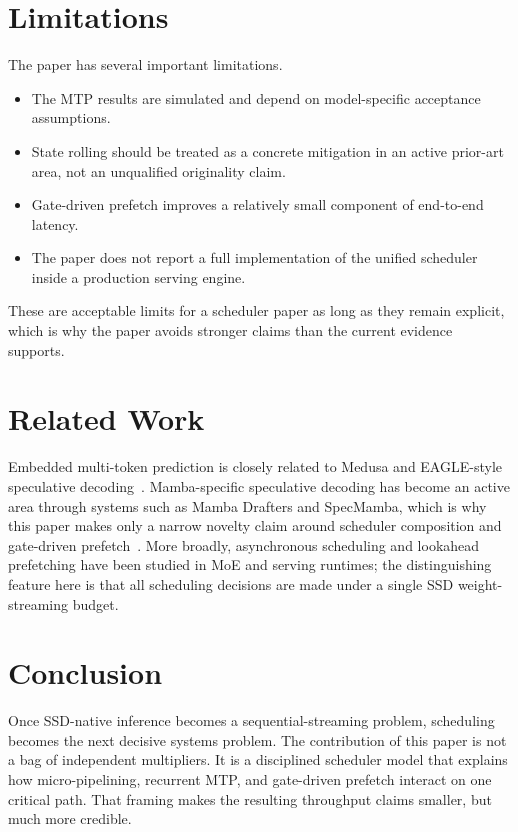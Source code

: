 \documentclass[11pt]{article}
\begin{document}
\section{Limitations}
The paper has several important limitations.
\begin{itemize}
    \item The MTP results are simulated and depend on model-specific acceptance assumptions.
    \item State rolling should be treated as a concrete mitigation in an active prior-art area, not an unqualified originality claim.
    \item Gate-driven prefetch improves a relatively small component of end-to-end latency.
    \item The paper does not report a full implementation of the unified scheduler inside a production serving engine.
\end{itemize}

These are acceptable limits for a scheduler paper as long as they remain explicit, which is why the paper avoids stronger claims than the current evidence supports.

\section{Related Work}
Embedded multi-token prediction is closely related to Medusa and EAGLE-style speculative decoding~\cite{medusa,eagle}. Mamba-specific speculative decoding has become an active area through systems such as Mamba Drafters and SpecMamba, which is why this paper makes only a narrow novelty claim around scheduler composition and gate-driven prefetch~\cite{mambadrafters,specmamba}. More broadly, asynchronous scheduling and lookahead prefetching have been studied in MoE and serving runtimes; the distinguishing feature here is that all scheduling decisions are made under a single SSD weight-streaming budget.

\section{Conclusion}
Once SSD-native inference becomes a sequential-streaming problem, scheduling becomes the next decisive systems problem. The contribution of this paper is not a bag of independent multipliers. It is a disciplined scheduler model that explains how micro-pipelining, recurrent MTP, and gate-driven prefetch interact on one critical path. That framing makes the resulting throughput claims smaller, but much more credible.
\end{document}
